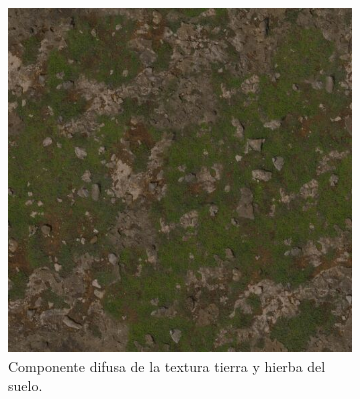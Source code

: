 
\begin{figure}[H]
    \centering 
	\begin{subfigure}[t]{0.48\textwidth}
	    \centering
        \includegraphics[width=\textwidth]{imagenes/converted/coast_sand_rocks_02_diff_4k.jpg}
        \caption{Componente difusa de la textura tierra y hierba del suelo.}
        \label{fig:coastsand}
    \end{subfigure}
    \hfill 
	\begin{subfigure}[t]{0.48\textwidth}
	    \centering

\end{subfigure}
\end{figure}
